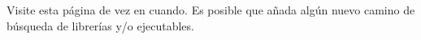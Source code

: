 %
%
%
%

Visite esta página de vez en cuando. Es posible que añada algún nuevo camino
de búsqueda de librerías y/o ejecutables.

